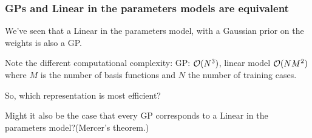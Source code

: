 \begin{frame}
\frametitle{GPs and Linear in the parameters models are equivalent}

We've seen that a Linear in the parameters model, with a Gaussian prior on
the weights is also a GP.

Note the different computational complexity: GP: ${\cal O}(N^3)$,
linear model ${\cal O}(NM^2)$ where $M$ is the number of basis
functions and $N$ the number of training cases.

So, which representation is most efficient?

Might it also be the case that every GP corresponds to a Linear in the
parameters model?\hfill (Mercer's theorem.)
\end{frame}


